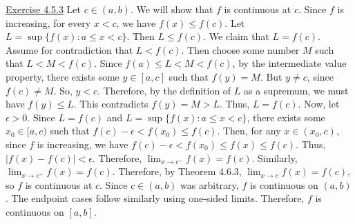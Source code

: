 \documentclass{exam}
\begin{document}
\underline{Exercise 4.5.3}
\newline
\newline
Let $c\in(a,b)$. We will show that $f$ is continuous at $c$. Since $f$ is increasing, for every $x<c$, we have $f(x)\le f(c)$. Let $L=\sup\{f(x):a\le x<c\}$. Then $L\le f(c)$. We claim that $L=f(c)$. Assume for contradiction that $L<f(c)$. Then choose some number $M$ such that $L<M<f(c)$. Since $f(a)\le L<M<f(c)$, by the intermediate value property, there exists some $y\in[a,c]$ such that $f(y)=M$. But $y\ne c$, since $f(c)\ne M$. So, $y<c$. Therefore, by the definition of $L$ as a supremum, we must have $f(y)\le L$. This contradicts $f(y)=M>L$. Thus, $L=f(c)$.
\newline
\newline
Now, let $\epsilon>0$. Since $L=f(c)$ and $L=\sup\{f(x):a\le x<c\}$, there exists some $x_0\in[a,c)$ such that $f(c)-\epsilon<f(x_0)\le f(c)$. Then, for any $x\in(x_0,c)$, since $f$ is increasing, we have $f(c)-\epsilon<f(x_0)\le f(x)\le f(c)$. Thus, $|f(x)-f(c)|<\epsilon$. Therefore, $\lim_{x\to c^-}f(x)=f(c)$.
\newline
\newline
Similarly, $\lim_{x\to c^+}f(x)=f(c)$. Therefore, by Theorem 4.6.3, $\lim_{x\to c}f(x)=f(c)$, so $f$ is continuous at $c$. Since $c\in(a,b)$ was arbitrary, $f$ is continuous on $(a,b)$.
\newline
\newline
The endpoint cases follow similarly using one-sided limits. Therefore, $f$ is continuous on $[a,b]$.
\newline
\end{document}

